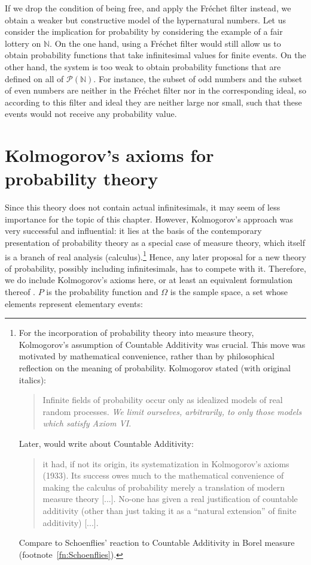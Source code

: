 If we drop the condition of being free, and apply the Fr\'{e}chet filter instead, we obtain a weaker but constructive model of the hypernatural numbers.
Let us consider the implication for probability by considering the example of a fair lottery on $\mathbb{N}$. On the one hand, using a Fr\'{e}chet filter would still allow us to obtain probability functions that take infinitesimal values for finite events. On the other hand, the system is too weak to obtain probability functions that are defined on all of $\mathcal{P}(\mathbb{N})$. For instance, the subset of odd numbers and the subset of even numbers are neither in the Fr\'{e}chet filter nor in the corresponding ideal, so according to this filter and ideal they are neither large nor small, such that these events would not receive any probability value.

\section{Kolmogorov's axioms for probability theory}\label{sec:KolmAxioms}
Since this theory does not contain actual infinitesimals, it may seem of less importance for the topic of this chapter. However, Kolmogorov's approach was very successful and influential: it lies at the basis of the contemporary presentation of probability theory as a special case of measure theory, which itself is a branch of real analysis (calculus).\footnote{For the incorporation of probability theory into measure theory, Kolmogorov's assumption of Countable Additivity was crucial. This move was motivated by mathematical convenience, rather than by philosophical reflection on the meaning of probability. Kolmogorov stated (with original italics):
\begin{quote}
Infinite fields of probability occur only as idealized models of real random processes. \emph{We limit ourselves, arbitrarily, to only those models which satisfy Axiom VI}. \citep[p.~15]{Kolmogorov:1933}
\end{quote}
Later, \citet[Vol.~I, p.~119]{deFinetti:1974} would write about Countable Additivity:
\begin{quote}
it had, if not its origin, its systematization in Kolmogorov's axioms (1933). Its success owes much to the mathematical convenience of making the calculus of probability merely a translation of modern measure theory [...]. No-one has given a real justification of countable additivity (other than just taking it as a ``natural extension'' of finite additivity) [...].
\end{quote}
Compare to Schoenflies' reaction to Countable Additivity in Borel measure (footnote~\ref{fn:Schoenflies}).
} Hence, any later proposal for a new theory of probability, possibly including infinitesimals, has to compete with it. Therefore, we do include Kolmogorov's axioms here, or at least an equivalent formulation thereof \citep[taken from][]{Benci_etal:2013}. $P$ is the probability function and $\Omega$ is the sample space, a set whose elements represent elementary events:

